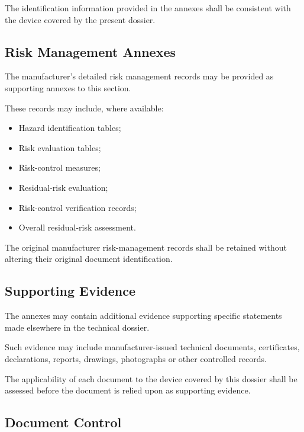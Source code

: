 The identification information provided in the annexes shall be
consistent with the device covered by the present dossier.

\subsection{Risk Management Annexes}

The manufacturer's detailed risk management records may be provided
as supporting annexes to this section.

These records may include, where available:

\begin{itemize}

    \item Hazard identification tables;

    \item Risk evaluation tables;

    \item Risk-control measures;

    \item Residual-risk evaluation;

    \item Risk-control verification records;

    \item Overall residual-risk assessment.

\end{itemize}

The original manufacturer risk-management records shall be retained
without altering their original document identification.

\subsection{Supporting Evidence}

The annexes may contain additional evidence supporting specific
statements made elsewhere in the technical dossier.

Such evidence may include manufacturer-issued technical documents,
certificates, declarations, reports, drawings, photographs or other
controlled records.

The applicability of each document to the device covered by this
dossier shall be assessed before the document is relied upon as
supporting evidence.

\subsection{Document Control}

